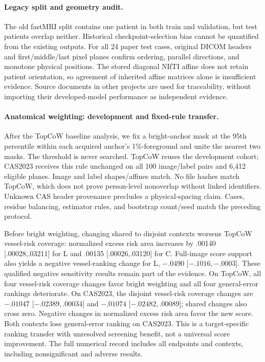 \paragraph{Legacy split and geometry audit.}
The old fastMRI split contains one patient in both train and validation, but test patients overlap neither. Historical checkpoint-selection bias cannot be quantified from the existing outputs. For all 24 paper test cases, original DICOM headers and first/middle/last pixel planes confirm ordering, parallel directions, and monotone physical positions. The stored diagonal NIfTI affine does not retain patient orientation, so agreement of inherited affine matrices alone is insufficient evidence. Source documents in other projects are used for traceability, without importing their developed-model performance as independent evidence.

\paragraph{Anatomical weighting: development and fixed-rule transfer.}
After the TopCoW baseline analysis, we fix a bright-anchor mask at the 95th percentile within each acquired anchor's 1\%-foreground and unite the nearest two masks. The threshold is never searched. TopCoW reuses the development cohort; CAS2023 receives this rule unchanged on all 100 image/label pairs and 6,412 eligible planes. Image and label shapes/affines match. No file hashes match TopCoW, which does not prove person-level nonoverlap without linked identifiers. Unknown CAS header provenance precludes a physical-spacing claim. Cases, residue balancing, estimator rules, and bootstrap count/seed match the preceding protocol.


Before bright weighting, changing shared to disjoint contexts worsens TopCoW vessel-risk coverage: normalized excess risk area increases by .00140 [.00028,.03211] for L and .00135 [.00026,.03120] for C. Full-image score support also yields a negative vessel-ranking change for L, $-.0490$ [$-.1016,-.0003$]. These qualified negative sensitivity results remain part of the evidence.
On TopCoW, all four vessel-risk coverage changes favor bright weighting and all four general-error rankings deteriorate. On CAS2023, the disjoint vessel-risk coverage changes are $-.01047$ [$-.02389,.00034$] and $-.01074$ [$-.02482,.00089$]; shared changes also cross zero. Negative changes in normalized excess risk area favor the new score. Both contexts lose general-error ranking on CAS2023. This is a target-specific ranking transfer with unresolved screening benefit, not a universal score improvement. The full numerical record includes all endpoints and contexts, including nonsignificant and adverse results.


